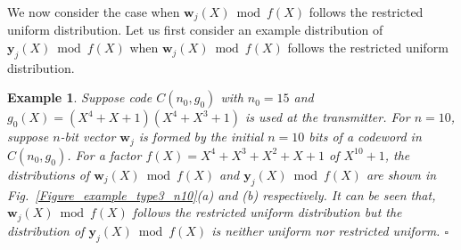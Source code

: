 \documentclass[10pt,journal]{IEEEtran}
\newtheorem{example}{Example}
\def \Fig {Fig.}
\begin{document}
We now consider the case when $\mathbf{w}_j(X) \bmod f(X)$ follows the restricted uniform distribution. 
Let us first consider an example distribution of $\mathbf{y}_j(X) \bmod f(X)$
when $\mathbf{w}_j(X) \bmod f(X)$ follows the restricted uniform distribution.
% 
\begin{example}
\label{Example_type3_noisy}
%  
Suppose code $C(n_0,g_0)$ with $n_0=15$ and $g_0(X) = (X^4+X+1)(X^4+X^3+1)$ is used at the transmitter.
For $n = 10$, suppose $n$-bit vector $\mathbf{w}_j$ is formed by the initial $n = 10$ bits of a codeword in $C(n_0,g_0)$.
For a factor $f(X) = X^4+X^3+X^2+X+1$ of $X^{10}+1$, the distributions of $\mathbf{w}_j(X) \bmod f(X)$ and $\mathbf{y}_j(X) \bmod f(X)$
are shown in \Fig~\ref{Figure_example_type3_n10}(a) and (b) respectively.
It can be seen that,  $\mathbf{w}_j(X) \bmod f(X)$ follows the restricted uniform distribution but the distribution
of $\mathbf{y}_j(X) \bmod f(X)$ is neither uniform nor restricted uniform.
\hfill $\square$
% 
\end{example}
% 
\end{document}
